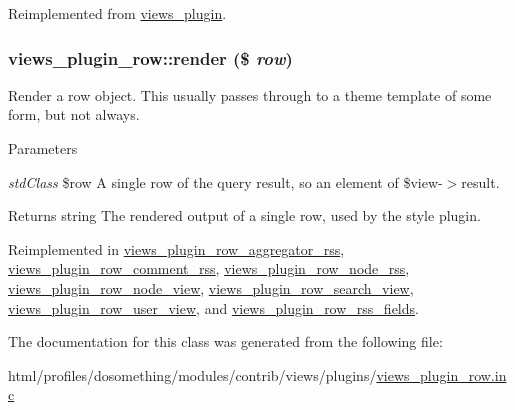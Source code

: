 Reimplemented from \hyperlink{classviews__plugin_a10ac07c47c4a8735786f9fcc38548587}{views\_\-plugin}.\hypertarget{classviews__plugin__row_a8243842e087dd28664b32cef0309f2a6}{
\subsubsection[{render}]{\setlength{\rightskip}{0pt plus 5cm}views\_\-plugin\_\-row::render (\$ {\em row})}}
\label{classviews__plugin__row_a8243842e087dd28664b32cef0309f2a6}
Render a row object. This usually passes through to a theme template of some form, but not always.


\begin{DoxyParams}{Parameters}
\item[{\em stdClass}]\$row A single row of the query result, so an element of \$view-\/$>$result.\end{DoxyParams}
\begin{DoxyReturn}{Returns}
string The rendered output of a single row, used by the style plugin. 
\end{DoxyReturn}


Reimplemented in \hyperlink{classviews__plugin__row__aggregator__rss_add4aa0892bf305556bb9a04c62da6027}{views\_\-plugin\_\-row\_\-aggregator\_\-rss}, \hyperlink{classviews__plugin__row__comment__rss_a89b115cbc1807d3b9659627f351b97e7}{views\_\-plugin\_\-row\_\-comment\_\-rss}, \hyperlink{classviews__plugin__row__node__rss_a94b9baa2d0a6e196f3da863cf1784343}{views\_\-plugin\_\-row\_\-node\_\-rss}, \hyperlink{classviews__plugin__row__node__view_a54c188103326e10c26a466d896e6d74b}{views\_\-plugin\_\-row\_\-node\_\-view}, \hyperlink{classviews__plugin__row__search__view_aec0c01f2e90075589b38f73381aa4ce7}{views\_\-plugin\_\-row\_\-search\_\-view}, \hyperlink{classviews__plugin__row__user__view_a7d3b462a1d5f7cac2630fb42c8185407}{views\_\-plugin\_\-row\_\-user\_\-view}, and \hyperlink{classviews__plugin__row__rss__fields_a5ee883780c5e3aa5469969022fdd9186}{views\_\-plugin\_\-row\_\-rss\_\-fields}.

The documentation for this class was generated from the following file:\begin{DoxyCompactItemize}
\item 
html/profiles/dosomething/modules/contrib/views/plugins/\hyperlink{views__plugin__row_8inc}{views\_\-plugin\_\-row.inc}\end{DoxyCompactItemize}
